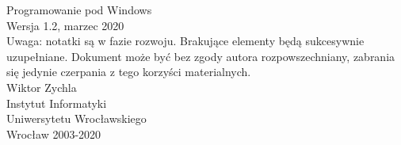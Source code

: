 ﻿\begin{titlepage}
\begin{center}
\textsf{
\Huge Programowanie pod Windows\\
\vspace*{1.5cm}
\small Wersja 1.2, marzec 2020\\
\vspace*{1.5cm}
Uwaga: notatki są w fazie rozwoju. Brakujące elementy będą sukcesywnie uzupełniane. 
Dokument może być bez zgody autora rozpowszechniany, zabrania się jedynie czerpania z tego 
korzyści materialnych.\\
\vspace*{4.5cm}
\Large Wiktor Zychla\\
\vspace{1.5cm}
\Large
Instytut Informatyki\\Uniwersytetu Wrocławskiego\\
\vfill
Wrocław 2003-2020}
\end{center}
\end{titlepage}
